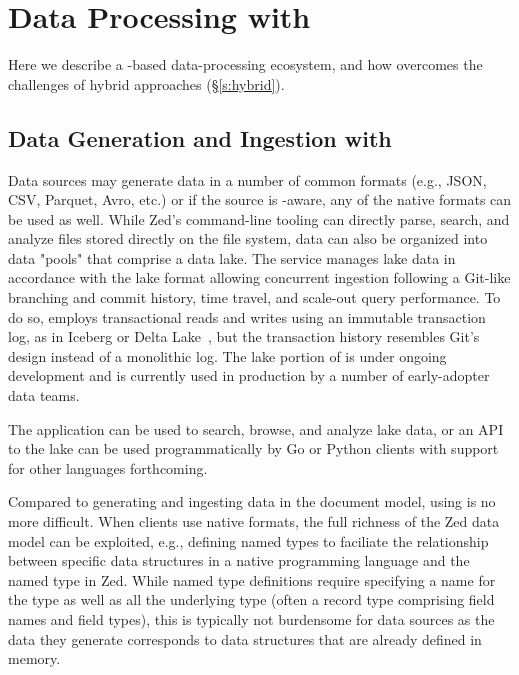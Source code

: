 \vspace{-0.6em}
\section{Data Processing with \sys{}} \label{s:zed_in_action}

Here we describe a \sys{}-based data-processing ecosystem, and how \sys{} overcomes the challenges of hybrid approaches (\S\ref{s:hybrid}).

\vspace{-0.9em}
\subsection{Data Generation and Ingestion with \sys{}}

Data sources may generate data in a number of common formats (e.g., JSON, CSV, Parquet, Avro, etc.) or if the source is \sys{}-aware, any of the native \sys{} formats can be used as well.  While Zed's command-line tooling can directly parse, search, and analyze files stored directly on the file system, \zed{} data can also be organized into data "pools" that comprise a \sys{} data lake.  The \zed{} service manages lake data in accordance with the \sys{} lake format allowing concurrent ingestion following a Git-like branching and commit history, time travel, and scale-out query performance.  To do so, \sys{} employs transactional reads and writes using an immutable transaction log, as in Iceberg or Delta Lake~\cite{delta_lake}, but the transaction history resembles Git's design instead of a monolithic log.  The \sys{} lake portion of \sys{} is under ongoing development and is currently used in production by a number of early-adopter data teams.

The  application can be used to search, browse, and analyze \sys{} lake data, or an API to the lake can be used programmatically by Go or Python clients with support for other languages forthcoming.

Compared to generating and ingesting data in the document model, using \sys{} is no more difficult.  When clients use native \sys{} formats, the full richness of the Zed data model can be exploited, e.g., defining named types to faciliate the relationship between specific data structures in a native programming language and the named type in Zed.  While named type definitions require specifying a name for the type as well as all the underlying type (often a record type comprising field names and field types), this is typically not burdensome for data sources as the data they generate corresponds to data structures that are already defined in memory.

